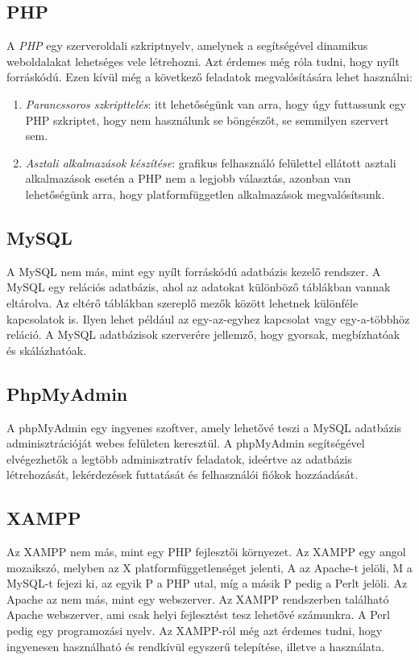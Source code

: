 \documentclass[]{thesis-ekf}
\theoremstyle{definition}
\theoremstyle{remark}
\begin{document}
	\subsection{PHP}
		A \emph{PHP} egy szerveroldali szkriptnyelv, amelynek a segítségével dinamikus weboldalakat lehetséges vele létrehozni. Azt érdemes még róla tudni, hogy nyílt forráskódú. Ezen kívül még a következő feladatok megvalósítására lehet használni:
		\begin{enumerate}
			\item \emph{Parancssoros szkripttelés}: itt lehetőségünk van arra, hogy úgy futtassunk egy PHP szkriptet, hogy nem használunk se böngészőt, se semmilyen szervert sem.
			\item \emph{Asztali alkalmazások készítése}: grafikus felhasználó felülettel ellátott asztali alkalmazások esetén a PHP nem a legjobb választás, azonban van lehetőségünk arra, hogy platformfüggetlen alkalmazások megvalósítsunk.
		\end{enumerate}
		\cite{PHP}
	\subsection{MySQL}
		A MySQL nem más, mint egy nyílt forráskódú adatbázis kezelő rendszer. A MySQL egy relációs adatbázis, ahol az adatokat különböző táblákban vannak eltárolva. Az eltérő táblákban szereplő mezők között lehetnek különféle kapcsolatok is. Ilyen lehet például az egy-az-egyhez kapcsolat vagy egy-a-többhöz reláció. A MySQL adatbázisok szerverére jellemző, hogy gyorsak, megbízhatóak és skálázhatóak.
		\cite{MySQL}
	\subsection{PhpMyAdmin}
		A phpMyAdmin egy ingyenes szoftver, amely lehetővé teszi a MySQL adatbázis adminisztrációját webes felületen keresztül. A phpMyAdmin segítségével elvégezhetők a legtöbb adminisztratív feladatok, ideértve az adatbázis létrehozását, lekérdezések futtatását és felhasználói fiókok hozzáadását. \cite{PhpMyAdmin}
	\subsection{XAMPP}
		Az XAMPP nem más, mint egy PHP fejlesztői környezet. Az XAMPP egy angol mozaikszó, melyben az X platformfüggetlenséget jelenti, A az Apache-t jelöli, M a MySQL-t fejezi ki, az egyik P a PHP utal, míg a másik P pedig a Perlt jelöli. Az Apache az nem más, mint egy webszerver. Az XAMPP rendszerben található Apache webszerver, ami csak helyi fejlesztést tesz lehetővé számunkra. A Perl pedig egy programozási nyelv. Az XAMPP-ról még azt érdemes tudni, hogy ingyenesen használható és rendkívül egyszerű telepítése, illetve a használata. \cite{XAMPP}
\end{document}
